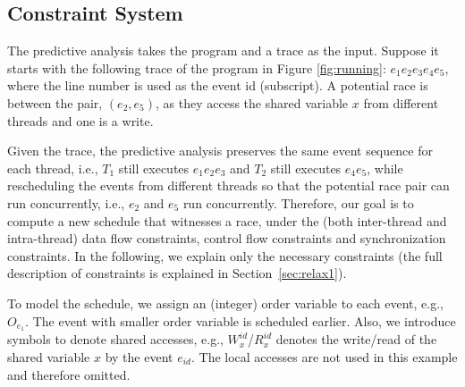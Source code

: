 \subsection{Constraint System}
The predictive analysis takes the program and a trace as the input.  Suppose it starts with the following trace of the program in  Figure \ref{fig:running}:  $e_1 e_2 e_3 e_4 e_5$, where the line number is used as the event id (subscript). A potential race is between the pair, $(e_2, e_5)$, as they access the shared variable $x$ from different threads and one is a write. 

Given the trace, the predictive analysis preserves the same event sequence for each thread, i.e., $T_1$ still executes $e_1 e_2 e_3$ and $T_2$ still executes $e_4 e_5$, 
while rescheduling the events from different threads so that the potential race pair can run concurrently, i.e., $e_2$ and $e_5$ run concurrently. Therefore, our goal is to compute a new schedule that witnesses a race, under the (both inter-thread and intra-thread) data flow constraints, control flow constraints and synchronization constraints. In the following, we explain only the necessary constraints (the full description of constraints is explained in Section~\ref{sec:relax1}).


To model the schedule, we assign an (integer) order  variable to each event, e.g., $O_{e_1}$. The event with smaller order variable is scheduled earlier.
Also, we introduce symbols to denote shared accesses, e.g., $W^{id}_{x}$/$R^{id}_{x}$ denotes the write/read of the shared variable $x$ by the event $e_{id}$.
The local accesses are not used in this example and therefore omitted.







